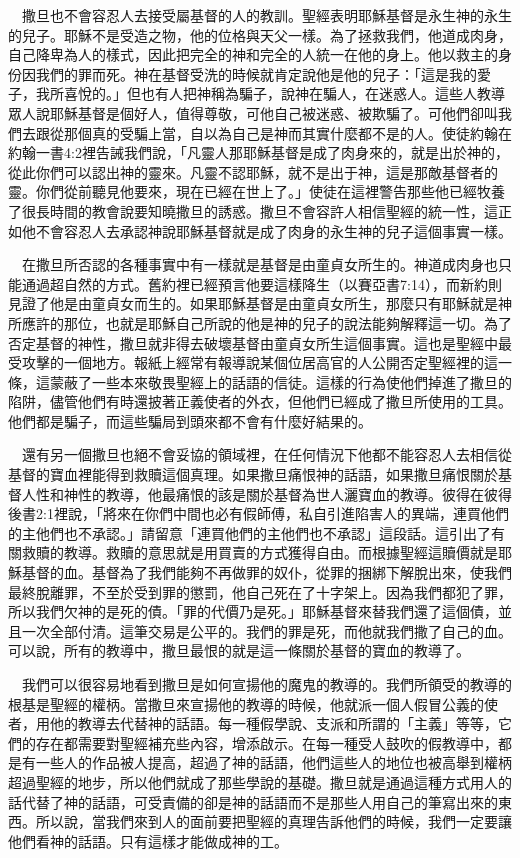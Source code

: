 \documentclass{book}
\begin{document}
　撒旦也不會容忍人去接受屬基督的人的教訓。聖經表明耶穌基督是永生神的永生的兒子。耶穌不是受造之物，他的位格與天父一樣。為了拯救我們，他道成肉身，自己降卑為人的樣式，因此把完全的神和完全的人統一在他的身上。他以救主的身份因我們的罪而死。神在基督受洗的時候就肯定說他是他的兒子：「這是我的愛子，我所喜悅的。」但也有人把神稱為騙子，說神在騙人，在迷惑人。這些人教導眾人說耶穌基督是個好人，值得尊敬，可他自己被迷惑、被欺騙了。可他們卻叫我們去跟從那個真的受騙上當，自以為自己是神而其實什麼都不是的人。使徒約翰在約翰一書4:2裡告誡我們說，「凡靈人那耶穌基督是成了肉身來的，就是出於神的，從此你們可以認出神的靈來。凡靈不認耶穌，就不是出于神，這是那敵基督者的靈。你們從前聽見他要來，現在已經在世上了。」使徒在這裡警告那些他已經牧養了很長時間的教會說要知曉撒旦的誘惑。撒旦不會容許人相信聖經的統一性，這正如他不會容忍人去承認神說耶穌基督就是成了肉身的永生神的兒子這個事實一樣。

　在撒旦所否認的各種事實中有一樣就是基督是由童貞女所生的。神道成肉身也只能通過超自然的方式。舊約裡已經預言他要這樣降生（以賽亞書7:14），而新約則見證了他是由童貞女而生的。如果耶穌基督是由童貞女所生，那麼只有耶穌就是神所應許的那位，也就是耶穌自己所說的他是神的兒子的說法能夠解釋這一切。為了否定基督的神性，撒旦就非得去破壞基督由童貞女所生這個事實。這也是聖經中最受攻擊的一個地方。報紙上經常有報導說某個位居高官的人公開否定聖經裡的這一條，這蒙蔽了一些本來敬畏聖經上的話語的信徒。這樣的行為使他們掉進了撒旦的陷阱，儘管他們有時還披著正義使者的外衣，但他們已經成了撒旦所使用的工具。他們都是騙子，而這些騙局到頭來都不會有什麼好結果的。

　還有另一個撒旦也絕不會妥協的領域裡，在任何情況下他都不能容忍人去相信從基督的寶血裡能得到救贖這個真理。如果撒旦痛恨神的話語，如果撒旦痛恨關於基督人性和神性的教導，他最痛恨的該是關於基督為世人灑寶血的教導。彼得在彼得後書2:1裡說，「將來在你們中間也必有假師傅，私自引進陷害人的異端，連買他們的主他們也不承認。」請留意「連買他們的主他們也不承認」這段話。這引出了有關救贖的教導。救贖的意思就是用買賣的方式獲得自由。而根據聖經這贖價就是耶穌基督的血。基督為了我們能夠不再做罪的奴仆，從罪的捆綁下解脫出來，使我們最終脫離罪，不至於受到罪的懲罰，他自己死在了十字架上。因為我們都犯了罪，所以我們欠神的是死的債。「罪的代價乃是死。」耶穌基督來替我們還了這個債，並且一次全部付清。這筆交易是公平的。我們的罪是死，而他就我們撒了自己的血。可以說，所有的教導中，撒旦最恨的就是這一條關於基督的寶血的教導了。

　我們可以很容易地看到撒旦是如何宣揚他的魔鬼的教導的。我們所領受的教導的根基是聖經的權柄。當撒旦來宣揚他的教導的時候，他就派一個人假冒公義的使者，用他的教導去代替神的話語。每一種假學說、支派和所謂的「主義」等等，它們的存在都需要對聖經補充些內容，增添啟示。在每一種受人鼓吹的假教導中，都是有一些人的作品被人提高，超過了神的話語，他們這些人的地位也被高舉到權柄超過聖經的地步，所以他們就成了那些學說的基礎。撒旦就是通過這種方式用人的話代替了神的話語，可受責備的卻是神的話語而不是那些人用自己的筆寫出來的東西。所以說，當我們來到人的面前要把聖經的真理告訴他們的時候，我們一定要讓他們看神的話語。只有這樣才能做成神的工。
\end{document}
